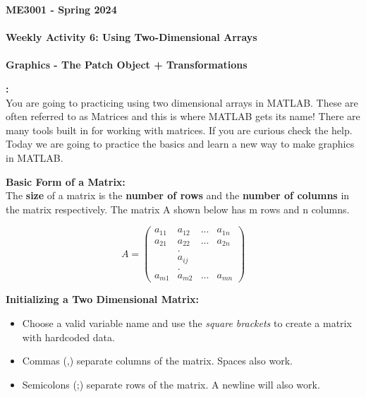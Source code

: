 \documentclass[11pt]{article}
\newcommand{\NUM}{6}
\begin{document}
	\textbf{\LARGE ME3001 - Spring 2024} \\\\
	\textbf{\LARGE Weekly Activity \NUM:  Using Two-Dimensional Arrays}\\\\
	\textbf{\LARGE Graphics - The Patch Object + Transformations} \\
	
	\begin{description}
        \vspace{5mm}
		\item [\textbf{ \Large Overview}] \textbf{ \Large :}\\
		
		You are going to practicing using two dimensional arrays in MATLAB. These are often referred to as Matrices and this is where MATLAB gets its name! There are many tools built in for working with matrices. If you are curious check the help. Today we are going to practice the basics and learn a new way to make graphics in MATLAB.

	    \item [\textbf{ \Large }] \textbf{ \Large Basic Form of a Matrix:}\\
	    
	    The {\bf size} of a matrix is the {\bf number of rows} and the  {\bf number of columns} in the matrix respectively. The matrix A shown below has m rows and n columns.
	    
\Large{
\[ A =\left( \begin{array}{cccc}
a_{11} & a_{12} & ...& a_{1n} \\
a_{21} & a_{22} & ...& a_{2n} \\
&.&&\\
&a_{ij}&&\\
&.&&\\
a_{m1} & a_{m2} & ...& a_{mn}\end{array} \right) \] }
		 
        \item [\textbf{ \Large }] \textbf{ \Large Initializing a Two Dimensional Matrix:}
		\begin{itemize}
	\item Choose a valid variable name and use the {\it square brackets} to create a matrix with hardcoded data.

	\item Commas (,) separate columns of the matrix. Spaces also work.

	\item Semicolons (;) separate rows of the matrix. A newline will also work.


\end{itemize}
\end{description}
\end{document}
